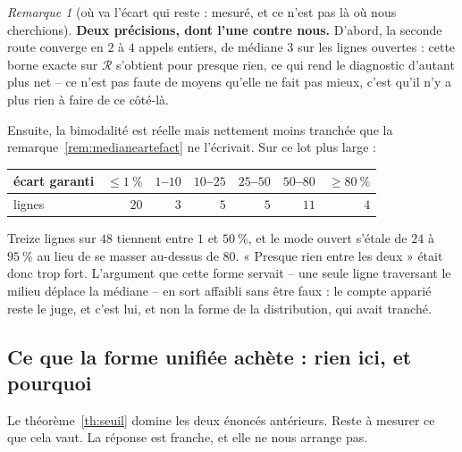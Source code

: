\documentclass[11pt,a4paper]{article}
\theoremstyle{plain}
\theoremstyle{remark}
\newtheorem{remark}{Remarque}
\newcommand{\Rcal}{\mathcal{R}}
\begin{document}
\begin{remark}[où va l'écart qui reste : mesuré, et ce n'est pas là où nous
cherchions]
\medskip\noindent
\textbf{Deux précisions, dont l'une contre nous.} D'abord, la seconde route
converge en $2$ à $4$ appels entiers, de médiane $3$ sur les lignes
ouvertes : cette borne exacte sur $\Rcal$ s'obtient pour presque rien, ce
qui rend le diagnostic d'autant plus net -- ce n'est pas faute de moyens
qu'elle ne fait pas mieux, c'est qu'il n'y a plus rien à faire de ce
côté-là.

Ensuite, la bimodalité est réelle mais nettement moins tranchée que la
remarque~\ref{rem:medianeartefact} ne l'écrivait. Sur ce lot plus large :

\begin{center}\small
\begin{tabular}{lrrrrrr}
\toprule
écart garanti & $\le 1\ \%$ & $1$--$10$ & $10$--$25$ & $25$--$50$
& $50$--$80$ & $\ge 80\ \%$\\
\midrule
lignes & $20$ & $3$ & $5$ & $5$ & $11$ & $4$\\
\bottomrule
\end{tabular}
\end{center}

\noindent
Treize lignes sur $48$ tiennent entre $1$ et $50\ \%$, et le mode ouvert
s'étale de $24$ à $95\ \%$ au lieu de se masser au-dessus de $80$.
« Presque rien entre les deux » était donc trop fort. L'argument que cette
forme servait -- une seule ligne traversant le milieu déplace la médiane --
en sort affaibli sans être faux : le compte apparié reste le juge, et c'est
lui, et non la forme de la distribution, qui avait tranché.
\end{remark}

\subsection{Ce que la forme unifiée achète : rien ici, et pourquoi}
\label{sec:unifie}

Le théorème~\ref{th:seuil} domine les deux énoncés antérieurs. Reste à
mesurer ce que cela vaut. La réponse est franche, et elle ne nous arrange
pas.
\end{document}
